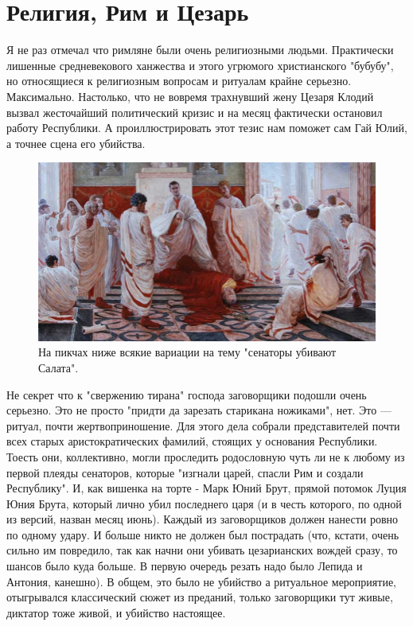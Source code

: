 \chapter{Религия, Рим и Цезарь}

Я не раз отмечал что римляне были очень религиозными людьми. Практически лишенные средневекового ханжества и этого угрюмого христианского "бубубу", но относящиеся к религиозным вопросам и ритуалам крайне серьезно. Максимально. Настолько, что не вовремя трахнувший жену Цезаря Клодий вызвал жесточайший политический кризис и на месяц фактически остановил работу Республики. А проиллюстрировать этот тезис нам поможет сам Гай Юлий, а точнее сцена его убийства.

\begin{figure}[h!tb] 
	\centering\includegraphics[scale=0.6]{ReligionRomeCaesar/15957456631798748.png}
	\caption{На пикчах ниже всякие вариации на тему "сенаторы убивают Салата".}%
\end{figure}
Не секрет что к "свержению тирана" господа заговорщики подошли очень серьезно. Это не просто "придти да зарезать старикана ножиками", нет. Это — ритуал, почти жертвоприношение. Для этого дела собрали представителей почти всех старых аристократических фамилий, стоящих у основания Республики. Тоесть они, коллективно, могли проследить родословную чуть ли не к любому из первой плеяды сенаторов, которые "изгнали царей, спасли Рим и создали Республику". И, как вишенка на торте - Марк Юний Брут, прямой потомок Луция Юния Брута, который лично убил последнего царя (и в честь которого, по одной из версий, назван месяц июнь). Каждый из заговорщиков должен нанести ровно по одному удару. И больше никто не должен был пострадать (что, кстати, очень сильно им повредило, так как начни они убивать цезарианских вождей сразу, то шансов было куда больше. В первую очередь резать надо было Лепида и Антония, канешно). В общем, это было не убийство а ритуальное мероприятие, отыгрывался классический сюжет из преданий, только заговорщики тут живые, диктатор тоже живой, и убийство настоящее. 

